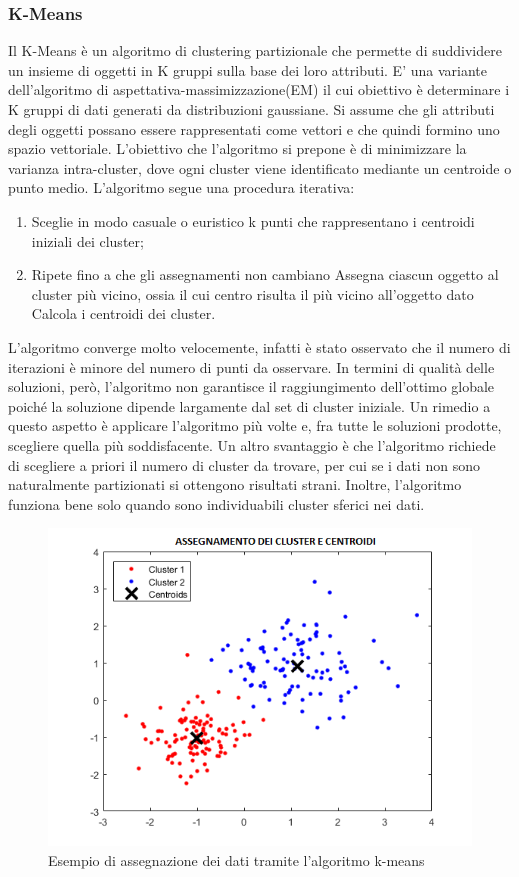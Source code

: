 \subsubsection{K-Means}
Il K-Means è un algoritmo di clustering partizionale che permette di suddividere un insieme di oggetti in K gruppi sulla base dei loro attributi. E' una variante dell'algoritmo di aspettativa-massimizzazione(EM) il cui obiettivo è determinare i K gruppi di dati generati da distribuzioni gaussiane. Si assume che gli attributi degli oggetti possano essere rappresentati come vettori e che quindi formino uno spazio vettoriale. L'obiettivo che l'algoritmo si prepone è di minimizzare la varianza intra-cluster, dove ogni cluster viene identificato mediante un centroide o punto medio. L'algoritmo segue una procedura iterativa:
\begin{enumerate}
	\item Sceglie in modo casuale o euristico k punti che rappresentano i centroidi iniziali dei cluster;
	\item Ripete fino a che gli assegnamenti non cambiano
	\subitem Assegna ciascun oggetto al cluster più vicino, ossia il cui centro risulta il più vicino all'oggetto dato
	\subitem Calcola i centroidi dei cluster.
\end{enumerate}
L'algoritmo converge molto velocemente, infatti è stato osservato che il numero di iterazioni è minore del numero di punti da osservare. In termini di qualità delle soluzioni, però, l'algoritmo non garantisce il raggiungimento dell'ottimo globale poiché la soluzione dipende largamente dal set di cluster iniziale. Un rimedio a questo aspetto è applicare l'algoritmo più volte e, fra tutte le soluzioni prodotte, scegliere quella più soddisfacente. Un altro svantaggio è che l'algoritmo richiede di scegliere a priori il numero di cluster da trovare, per cui se i dati non sono naturalmente partizionati si ottengono risultati strani. Inoltre, l'algoritmo funziona bene solo quando sono individuabili cluster sferici nei dati.
\begin{figure}[h!]
	\centering
	\includegraphics[scale=0.50]{images/example_kmeans.png}
	\caption{Esempio di assegnazione dei dati tramite l'algoritmo k-means}
\end{figure}
